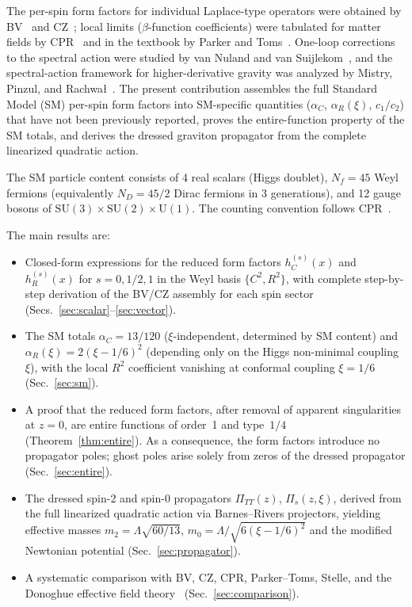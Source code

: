 \documentclass[aps,prd,twocolumn,superscriptaddress,nofootinbib,floatfix]{revtex4-2}
\theoremstyle{definition}
\theoremstyle{remark}
\begin{document}
The per-spin form factors for individual Laplace-type operators were obtained
by BV~\cite{Barvinsky:1987uw,Barvinsky:1990up} and
CZ~\cite{Codello:2012kq}; local limits ($\beta$-function coefficients) were
tabulated for matter fields by CPR~\cite{Codello:2008vh} and in the textbook
by Parker and Toms~\cite{Parker:2009uva}. One-loop corrections to the
spectral action were studied by van Nuland and van
Suijlekom~\cite{vanNuland:2022xkm}, and the spectral-action framework for
higher-derivative gravity was analyzed by Mistry, Pinzul, and
Rachwa{\l}~\cite{Mistry:2020xqh}. The present contribution assembles the
full Standard Model (SM) per-spin form factors into SM-specific quantities
($\alpha_C$, $\alpha_R(\xi)$, $c_1/c_2$) that have not been previously
reported, proves the entire-function property of the SM totals, and derives
the dressed graviton propagator from the complete linearized quadratic action.

The SM particle content consists of 4 real scalars (Higgs doublet),
$N_f = 45$ Weyl fermions (equivalently $N_D = 45/2$ Dirac fermions in 3
generations), and 12 gauge bosons of $\mathrm{SU}(3) \times \mathrm{SU}(2)
\times \mathrm{U}(1)$. The counting convention follows
CPR~\cite{Codello:2008vh}.

The main results are:
\begin{itemize}
\item Closed-form expressions for the reduced form factors
  $h_C^{(s)}(x)$ and $h_R^{(s)}(x)$ for $s = 0, 1/2, 1$ in the Weyl basis
  $\{C^2, R^2\}$, with complete step-by-step derivation of the BV/CZ assembly
  for each spin sector (Secs.~\ref{sec:scalar}--\ref{sec:vector}).
\item The SM totals $\alpha_C = 13/120$ ($\xi$-independent, determined by SM
  content) and $\alpha_R(\xi) = 2(\xi - 1/6)^2$ (depending only on the Higgs
  non-minimal coupling $\xi$), with the local $R^2$ coefficient vanishing at
  conformal coupling $\xi = 1/6$ (Sec.~\ref{sec:sm}).
\item A proof that the reduced form factors, after removal of apparent
  singularities at $z = 0$, are entire functions of order~1 and type~$1/4$
  (Theorem~\ref{thm:entire}). As a consequence, the form factors introduce no
  propagator poles; ghost poles arise solely from zeros of the dressed
  propagator (Sec.~\ref{sec:entire}).
\item The dressed spin-2 and spin-0 propagators
  $\Pi_{TT}(z)$, $\Pi_s(z,\xi)$, derived from the full linearized quadratic
  action via Barnes--Rivers projectors, yielding effective masses
  $m_2 = \Lambda\sqrt{60/13}$, $m_0 = \Lambda/\sqrt{6(\xi - 1/6)^2}$ and the
  modified Newtonian potential (Sec.~\ref{sec:propagator}).
\item A systematic comparison with BV, CZ, CPR, Parker--Toms, Stelle, and the
  Donoghue effective field theory~\cite{Donoghue:1994dn,BjerrumBohr:2002kt}
  (Sec.~\ref{sec:comparison}).
\end{itemize}
\end{document}
